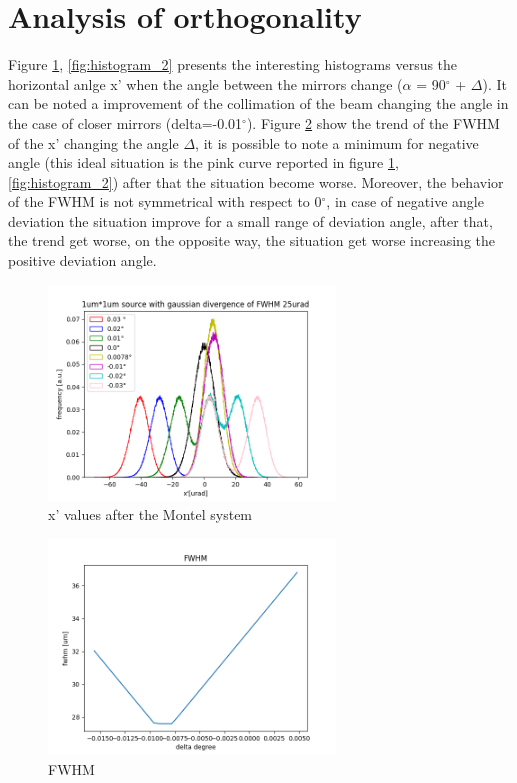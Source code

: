 \documentclass[a4paper]{article}
\begin{document}
\newpage

\section{Analysis of orthogonality}
Figure \ref{fig:histogram}, \ref{fig:histogram_2} presents the interesting histograms versus the horizontal anlge x' when the angle between the mirrors change ($\alpha $ = 90$^\circ$ + $\Delta$). It can be noted a improvement of the collimation of the beam changing the angle in the case of closer mirrors (delta=-0.01$^\circ$).
\newline Figure \ref{fig:FWHM} show the trend of the FWHM of the x' changing the angle $\Delta$, it is possible to note a minimum for negative angle (this ideal situation is the pink curve reported in figure \ref{fig:histogram}, \ref{fig:histogram_2}) after that the situation become worse. Moreover, the behavior of the FWHM is not symmetrical with respect to 0$^\circ$, in case of negative angle deviation the situation improve for a small range of deviation angle, after that, the trend get worse, on the opposite way, the situation get worse increasing the positive deviation angle.


\begin{figure}[H]
\centering
\includegraphics[width=0.68\textwidth]{histogram.png}
\caption{\label{fig:histogram} x' values after the Montel system}
\end{figure}


\begin{figure}[H]
\centering
\includegraphics[width=0.68\textwidth]{FWHM.png}
\caption{\label{fig:FWHM} FWHM}
\end{figure}
\end{document}
